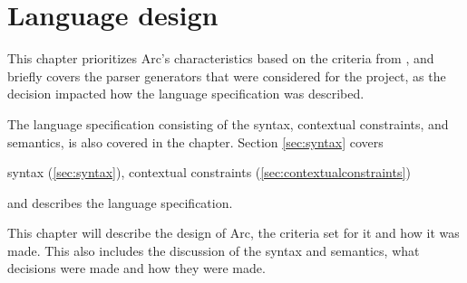 \chapter{Language design}\label{cha:languagedesign}
This chapter prioritizes Arc's characteristics based on the criteria from \cite{Sebesta2016}, and briefly covers the parser generators that were considered for the project, as the decision impacted how the language specification was described.

The language specification consisting of the syntax, contextual constraints, and semantics, is also covered in the chapter. Section \ref{sec:syntax} covers



syntax (\ref{sec:syntax}), contextual constraints (\ref{sec:contextualconstraints})

and describes the language specification.

This chapter will describe the design of Arc, the criteria set for it and how it was made. This also includes the discussion of the syntax and semantics, what decisions were made and how they were made.






